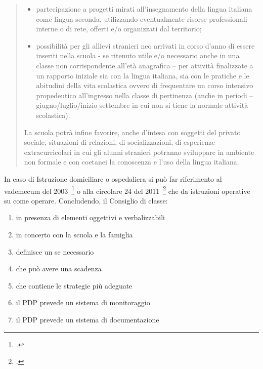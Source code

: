 \begin{quote}
\begin{description}
\begin{itemize}
			\item partecipazione a progetti mirati all'insegnamento della lingua italiana come lingua
			seconda, utilizzando eventualmente risorse professionali interne o di rete, offerti e/o
			organizzati dal territorio;
			\item 	possibilità per gli allievi stranieri neo arrivati in corso d'anno di essere inseriti nella
			scuola - se ritenuto utile e/o necessario anche in una classe non corrispondente
			all'età anagrafica – per attività finalizzate a un rapporto iniziale sia con la lingua
			italiana, sia con le pratiche e le abitudini della vita scolastica ovvero di frequentare
			un corso intensivo propedeutico all'ingresso nella classe di pertinenza (anche in periodi – giugno/luglio/inizio settembre in cui non si tiene la normale attività scolastica).
		\end{itemize}
	\mancatesto
		La scuola potrà infine favorire, anche d'intesa con soggetti del privato sociale, situazioni
		di relazioni, di socializzazioni, di esperienze extracurricolari in cui gli alunni stranieri potranno
		sviluppare in ambiente non formale e con coetanei la conoscenza e l'uso della lingua italiana.
	\end{description}
\end{quote}
In caso di Istruzione domiciliare o ospedaliera si può far riferimento al vademecum del 2003~\footcite{Vad_ist_dom} o alla circolare 24 del 2011~\footcite{cm_24_11} che da istruzioni operative su come operare. Concludendo, il Consiglio di classe: 
\begin{enumerate}
	\item in presenza di elementi oggettivi e verbalizzabili
	\item in concerto con la scuola e la famiglia
	\item definisce un  se necessario
	\item che può avere una scadenza
	\item che contiene le strategie più adeguate
	\item il PDP prevede un sistema di monitoraggio
	\item il PDP prevede un sistema di documentazione
\end{enumerate}
